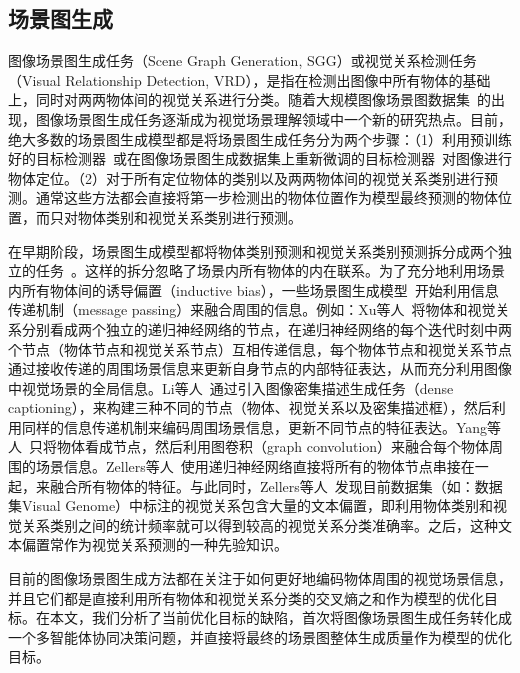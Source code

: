 \subsection{场景图生成}
图像场景图生成任务（Scene Graph Generation, SGG）或视觉关系检测任务（Visual Relationship Detection, VRD），是指在检测出图像中所有物体的基础上，同时对两两物体间的视觉关系进行分类。随着大规模图像场景图数据集~\cite{krishna2017visual}的出现，图像场景图生成任务逐渐成为视觉场景理解领域中一个新的研究热点。目前，绝大多数的场景图生成模型都是将场景图生成任务分为两个步骤：（1）利用预训练好的目标检测器~\cite{lu2016visual,zhuang2017towards,zhang2017visual,dai2017detecting,yang2018shuffle,yu2017visual}或在图像场景图生成数据集上重新微调的目标检测器~\cite{li2017vip,xu2017scene,yin2018zoom,zellers2018neural,zhang2017relationship,zhang2019large}对图像进行物体定位。（2）对于所有定位物体的类别以及两两物体间的视觉关系类别进行预测。通常这些方法都会直接将第一步检测出的物体位置作为模型最终预测的物体位置，而只对物体类别和视觉关系类别进行预测。


在早期阶段，场景图生成模型都将物体类别预测和视觉关系类别预测拆分成两个独立的任务~\cite{lu2016visual,zhang2017visual,zhuang2017towards,zhu2018deep,zhang2017relationship}。这样的拆分忽略了场景内所有物体的内在联系。为了充分地利用场景内所有物体间的诱导偏置（inductive bias），一些场景图生成模型~\cite{xu2017scene,dai2017detecting,li2017scene,li2018factorizable,yin2018zoom,jae2018tensorize,yang2018graph,tang2019learning,gu2019scene,qi2019attentive,wang2019exploring}开始利用信息传递机制（message passing）来融合周围的信息。例如：Xu等人~\cite{xu2017scene}将物体和视觉关系分别看成两个独立的递归神经网络的节点，在递归神经网络的每个迭代时刻中两个节点（物体节点和视觉关系节点）互相传递信息，每个物体节点和视觉关系节点通过接收传递的周围场景信息来更新自身节点的内部特征表达，从而充分利用图像中视觉场景的全局信息。Li等人~\cite{li2017scene}通过引入图像密集描述生成任务（dense captioning），来构建三种不同的节点（物体、视觉关系以及密集描述框），然后利用同样的信息传递机制来编码周围场景信息，更新不同节点的特征表达。Yang等人~\cite{yang2018graph}只将物体看成节点，然后利用图卷积（graph convolution）来融合每个物体周围的场景信息。Zellers等人~\cite{zellers2018neural}使用递归神经网络直接将所有的物体节点串接在一起，来融合所有物体的特征。与此同时，Zellers等人~\cite{zellers2018neural}发现目前数据集（如：数据集Visual Genome）中标注的视觉关系包含大量的文本偏置，即利用物体类别和视觉关系类别之间的统计频率就可以得到较高的视觉关系分类准确率。之后，这种文本偏置常作为视觉关系预测的一种先验知识。

目前的图像场景图生成方法都在关注于如何更好地编码物体周围的视觉场景信息，并且它们都是直接利用所有物体和视觉关系分类的交叉熵之和作为模型的优化目标。在本文，我们分析了当前优化目标的缺陷，首次将图像场景图生成任务转化成一个多智能体协同决策问题，并直接将最终的场景图整体生成质量作为模型的优化目标。

